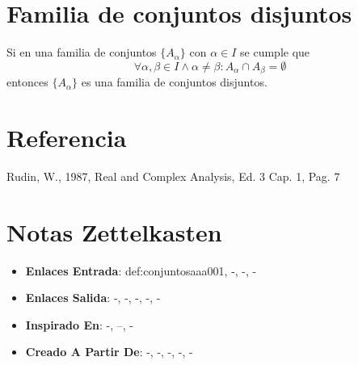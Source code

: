 \documentclass[12pt]{article}
\begin{document}
\section*{Familia de conjuntos disjuntos}

\begin{definition}
Si en una familia de conjuntos $\{A_{\alpha}\}$ con $\alpha \in I$ se cumple que 
\[ \forall \alpha, \beta \in I  \land \alpha \neq \beta: A_{\alpha} \cap A_{\beta} = \emptyset \]
entonces $\{A_{\alpha}\}$ es una familia de conjuntos disjuntos.
\end{definition}

\section*{Referencia}
Rudin, W., 1987, Real and Complex Analysis, Ed. 3 Cap. 1, Pag. 7 

\section*{Notas Zettelkasten}
\begin{itemize}
  \item \textbf{Enlaces Entrada}: def:conjuntosaaa001, -, -, -
  \item \textbf{Enlaces Salida}: -, -, -, -, -
  \item \textbf{Inspirado En}: -, --, -
  \item \textbf{Creado A Partir De}: -, -, -, -, -
\end{itemize}
\end{document}
